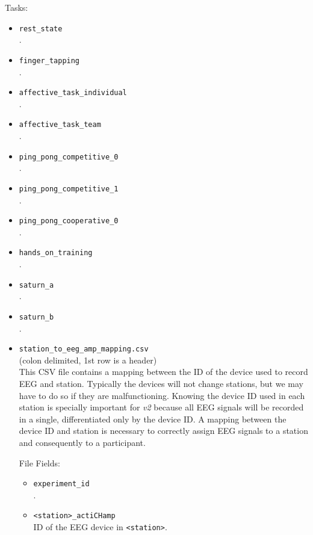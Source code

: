 \begin{itemize}
\bigskip
Tasks:
\begin{itemize}
    \item \verb|rest_state|\\.
    \item \verb|finger_tapping|\\.
    \item \verb|affective_task_individual|\\.	
	\item \verb|affective_task_team|\\.
    \item \verb|ping_pong_competitive_0|\\.
    \item \verb|ping_pong_competitive_1|\\.
	\item \verb|ping_pong_cooperative_0|\\.
	\item \verb|hands_on_training|\\.
	\item \verb|saturn_a|\\.
	\item \verb|saturn_b|\\.	
\end{itemize}
\end{itemize}

\begin{itemize}
\item\verb|station_to_eeg_amp_mapping.csv|\\
    (colon delimited, 1st row is a header)\\
    This CSV file contains a mapping between the ID of the device used to record EEG and station. Typically the devices will not change  stations, but we may have to do so if they are malfunctioning. Knowing the device ID used in each station is specially important for \emph{v2} because all EEG signals will be recorded in a single, differentiated only by the device ID. A mapping between the device ID and station is necessary to correctly assign EEG signals to a station and consequently to a participant.
    
File Fields:
\begin{itemize}
    \item \verb|experiment_id|\\.        
    \item \verb|<station>_actiCHamp|\\
	ID of the EEG device in \verb|<station>|.
\end{itemize}
\end{itemize}



